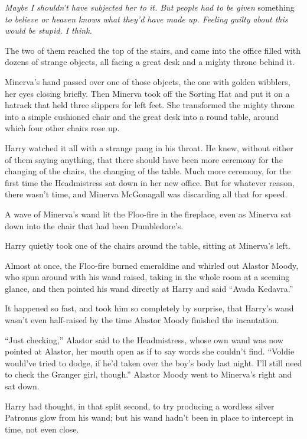 \emph{Maybe I shouldn't have subjected her to it. But people had to be given} something \emph{to believe or heaven knows what they'd have made up. Feeling guilty about this would be stupid. I think.}

The two of them reached the top of the stairs, and came into the office filled with dozens of strange objects, all facing a great desk and a mighty throne behind it.

Minerva's hand passed over one of those objects, the one with golden wibblers, her eyes closing briefly. Then Minerva took off the Sorting Hat and put it on a hatrack that held three slippers for left feet. She transformed the mighty throne into a simple cushioned chair and the great desk into a round table, around which four other chairs rose up.

Harry watched it all with a strange pang in his throat. He knew, without either of them saying anything, that there should have been more ceremony for the changing of the chairs, the changing of the table. Much more ceremony, for the first time the Headmistress sat down in her new office. But for whatever reason, there wasn't time, and Minerva McGonagall was discarding all that for speed.

A wave of Minerva's wand lit the Floo-fire in the fireplace, even as Minerva sat down into the chair that had been Dumbledore's.

Harry quietly took one of the chairs around the table, sitting at Minerva's left.

Almost at once, the Floo-fire burned emeraldine and whirled out Alastor Moody, who spun around with his wand raised, taking in the whole room at a seeming glance, and then pointed his wand directly at Harry and said ``Avada Kedavra.''

It happened so fast, and took him so completely by surprise, that Harry's wand wasn't even half-raised by the time Alastor Moody finished the incantation.

``Just checking,'' Alastor said to the Headmistress, whose own wand was now pointed at Alastor, her mouth open as if to say words she couldn't find. ``Voldie would've tried to dodge, if he'd taken over the boy's body last night. I'll still need to check the Granger girl, though.'' Alastor Moody went to Minerva's right and sat down.

Harry had thought, in that split second, to try producing a wordless silver Patronus glow from his wand; but his wand hadn't been in place to intercept in time, not even close.

